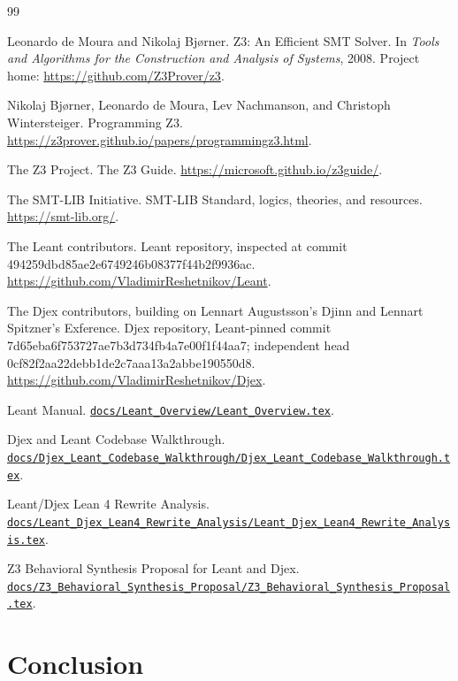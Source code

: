 \documentclass[10pt,letterpaper,oneside]{report}
\newcommand{\commitid}[1]{{\ttfamily\footnotesize #1}}
\def\LeantCommit{494259dbd85ae2e6749246b08377f44b2f9936ac}
\def\DjexCommit{0cf82f2aa22debb1de2c7aaa13a2abbe190550d8}
\def\DjexPinnedCommit{7d65eba6f753727ae7b3d734fb4a7e00f1f44aa7}
\def\LeantBase{https://github.com/VladimirReshetnikov/Leant/blob/\LeantCommit/}
\newcommand{\lpath}[1]{\href{\LeantBase#1}{\nolinkurl{#1}}}
\begin{document}
\begin{thebibliography}{99}

Leonardo de Moura and Nikolaj Bj\o rner.
\newblock Z3: An Efficient SMT Solver.
\newblock In \emph{Tools and Algorithms for the Construction and Analysis of Systems}, 2008.
\newblock Project home: \url{https://github.com/Z3Prover/z3}.

Nikolaj Bj\o rner, Leonardo de Moura, Lev Nachmanson, and Christoph Wintersteiger.
\newblock Programming Z3.
\newblock \url{https://z3prover.github.io/papers/programmingz3.html}.

The Z3 Project.
\newblock The Z3 Guide.
\newblock \url{https://microsoft.github.io/z3guide/}.

The SMT-LIB Initiative.
\newblock SMT-LIB Standard, logics, theories, and resources.
\newblock \url{https://smt-lib.org/}.

The Leant contributors.
\newblock Leant repository, inspected at commit \commitid{\LeantCommit}.
\newblock \url{https://github.com/VladimirReshetnikov/Leant}.

The Djex contributors, building on Lennart Augustsson's Djinn and Lennart Spitzner's Exference.
\newblock Djex repository, Leant-pinned commit \commitid{\DjexPinnedCommit}; independent head \commitid{\DjexCommit}.
\newblock \url{https://github.com/VladimirReshetnikov/Djex}.

\newblock Leant Manual.
\newblock \lpath{docs/Leant_Overview/Leant_Overview.tex}.

\newblock Djex and Leant Codebase Walkthrough.
\newblock \lpath{docs/Djex_Leant_Codebase_Walkthrough/Djex_Leant_Codebase_Walkthrough.tex}.

\newblock Leant/Djex Lean 4 Rewrite Analysis.
\newblock \lpath{docs/Leant_Djex_Lean4_Rewrite_Analysis/Leant_Djex_Lean4_Rewrite_Analysis.tex}.

\newblock Z3 Behavioral Synthesis Proposal for Leant and Djex.
\newblock \lpath{docs/Z3_Behavioral_Synthesis_Proposal/Z3_Behavioral_Synthesis_Proposal.tex}.

\end{thebibliography}

\chapter*{Conclusion}
\end{document}
